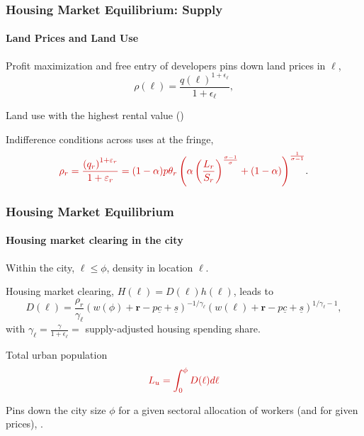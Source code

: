 \documentclass[aspectratio=169]{beamer}
\begin{document}
\begin{v75mins}
\begin{frame}
\frametitle{Housing Market Equilibrium: Supply}
\framesubtitle{Land Prices and Land Use}
\bi
\item Profit maximization and free entry of developers pins down land prices in $\ell$,
\begin{equation*}
\rho(\ell)=\frac{q(\ell)^{1+\epsilon_{\ell}}}{ 1+\epsilon_{\ell}},
\end{equation*}
\item Land use with the highest rental value ()
\item Indifference conditions across uses at the fringe,
\begin{equation*}
 \re{\rho_r=\frac{\left( q_r \right)^{1+\varepsilon_r}}{1+\varepsilon_r} = (1-\alpha)p\theta_r\left(\alpha \left(\frac{L_r}{S_r}\right)^{\frac{\sigma-1}{\sigma}} +(1-\alpha) \right)^{\frac{1}{\sigma-1}}}.
\end{equation*}
\ei
\end{frame}
\end{v75mins}


\begin{frame}
\frametitle{Housing Market Equilibrium}
\framesubtitle{Housing market clearing in the city}
\bi
\item Within the city, $\ell \leq \phi$, density  in location $\ell$.
\item Housing market clearing, $H(\ell)=D(\ell)h(\ell)$, leads to
\begin{equation*}
D(\ell)= \frac{\rho_r}{\gamma_{\ell}}(w(\phi)+\mathbf{r}-p\underline{c}+\underline{s}) ^{-1/\gamma_{\ell} } (w(\ell)+\mathbf{r}-p\underline{c}+\underline{s})^{1/\gamma_{\ell} -1},
\end{equation*}
with $\gamma_{\ell}=\frac{\gamma}{1+\epsilon_{\ell}}=$ supply-adjusted housing spending share.
\item Total urban population
\begin{equation}
\re{L_u=\int_0^{\phi}D(\ell)d\ell}  \label{eq:citysize}
\end{equation}
\item Pins down the city size $\phi$ for a given sectoral allocation of workers (and for given prices), .
\ei
\end{frame}
\end{document}
